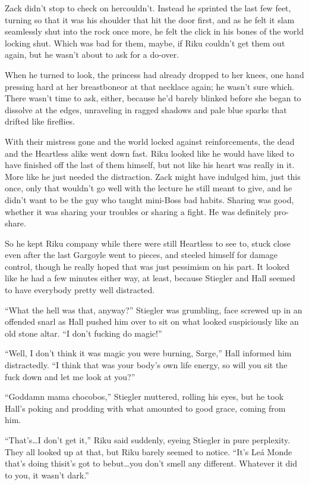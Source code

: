 Zack didn't stop to check on her\textemdash couldn't. Instead he sprinted the last few feet, turning so that it was his shoulder that hit the door first, and as he felt it slam seamlessly shut into the rock once more, he felt the click in his bones of the world locking shut. Which was bad for them, maybe, if Riku couldn't get them out again, but he wasn't about to ask for a do-over.

When he turned to look, the princess had already dropped to her knees, one hand pressing hard at her breastbone\textemdash or at that necklace again; he wasn't sure which. There wasn't time to ask, either, because he'd barely blinked before she began to dissolve at the edges, unraveling in ragged shadows and pale blue sparks that drifted like fireflies.

With their mistress gone and the world locked against reinforcements, the dead and the Heartless alike went down fast. Riku looked like he would have liked to have finished off the last of them himself, but not like his heart was really in it. More like he just needed the distraction. Zack might have indulged him, just this once, only that wouldn't go well with the lecture he still meant to give, and he didn't want to be the guy who taught mini-Boss bad habits. Sharing was good, whether it was sharing your troubles or sharing a fight. He was definitely pro-share.

So he kept Riku company while there were still Heartless to see to, stuck close even after the last Gargoyle went to pieces, and steeled himself for damage control, though he really hoped that was just pessimism on his part. It looked like he had a few minutes either way, at least, because Stiegler and Hall seemed to have everybody pretty well distracted.

``What the hell was that, anyway?'' Stiegler was grumbling, face screwed up in an offended snarl as Hall pushed him over to sit on what looked suspiciously like an old stone altar. ``I don't fucking do magic!''

``Well, I don't think it was magic you were burning, Sarge,'' Hall informed him distractedly. ``I think that was your body's own life energy, so will you sit the fuck down and let me look at you?''

``Goddamn mama chocobos,'' Stiegler muttered, rolling his eyes, but he took Hall's poking and prodding with what amounted to good grace, coming from him.

``That's\ldots I don't get it,'' Riku said suddenly, eyeing Stiegler in pure perplexity. They all looked up at that, but Riku barely seemed to notice. ``It's Leá Monde that's doing this\textemdash it's got to be\textemdash but\ldots you don't smell any different. Whatever it did to you, it wasn't dark.''

